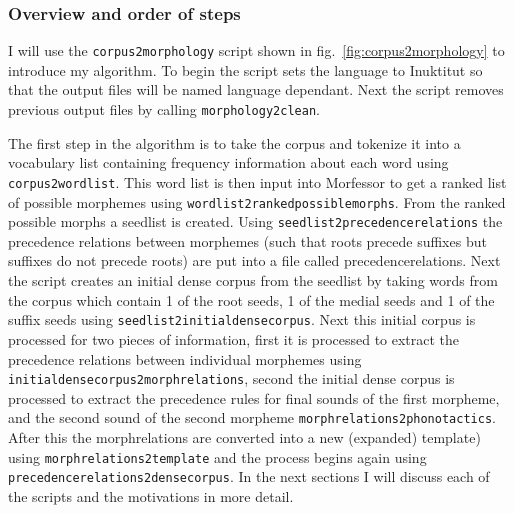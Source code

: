 \documentclass[runningheads,a4paper]{llncs}
\begin{document}
\subsubsection{Overview and order of steps}

I will use the {\tt corpus2morphology} script shown in fig.~\ref{fig:corpus2morphology} to introduce my algorithm. To begin the script sets the language to Inuktitut so that the output files will be named language dependant. Next the script removes previous output files by calling {\tt morphology2clean}. 

The first step in the algorithm is to take the corpus and tokenize it into a vocabulary list containing frequency information about each word using {\tt corpus2wordlist}. This word list is then input into Morfessor to get a ranked list of possible morphemes using {\tt wordlist2rankedpossiblemorphs}. From the ranked possible morphs a seedlist is created.  Using  {\tt seedlist2precedencerelations} the precedence relations between morphemes (such that roots precede suffixes but suffixes do not precede roots) are put into a file called precedencerelations. Next the script creates an initial dense corpus from the seedlist by taking words from the corpus which contain 1 of the root seeds, 1 of the medial seeds and 1 of the suffix seeds using {\tt seedlist2initialdensecorpus}. Next this initial corpus is processed for two pieces of information, first it is processed to extract the precedence relations between individual morphemes using {\tt initialdensecorpus2morphrelations}, second the initial dense corpus is processed to extract the precedence rules for final sounds of the first morpheme, and the second sound of the second morpheme {\tt morphrelations2phonotactics}. After this the morphrelations are converted into a new (expanded) template) using {\tt morphrelations2template} and the process begins again using {\tt precedencerelations2densecorpus}. In the next sections I will discuss each of the scripts and the motivations in more detail. 
\end{document}
